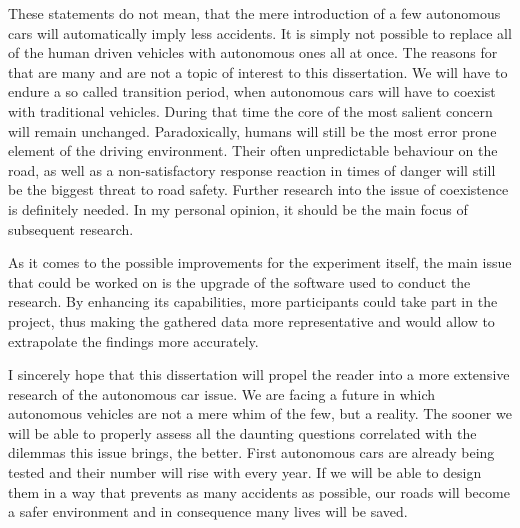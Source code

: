 \documentclass[11pt,english,twoside]{article}
\begin{document}
These statements do not mean, that the mere introduction of a few autonomous cars will automatically imply less accidents. It is simply not possible to replace all of the human driven vehicles with autonomous ones all at once. The reasons for that are many and are not a topic of interest to this dissertation. We will have to endure a so called transition period, when autonomous cars will have to coexist with traditional vehicles. During that time the core of the most salient concern will remain unchanged. Paradoxically, humans will still be the most error prone element of the driving environment. Their often unpredictable behaviour on the road, as well as a non-satisfactory response reaction in times of danger will still be the biggest threat to road safety. Further research into the issue of coexistence is definitely needed. In my personal opinion, it should be the main focus of subsequent research. 



As it comes to the possible improvements for the experiment itself, the main issue that could be worked on is the upgrade of the software used to conduct the research. By enhancing its capabilities, more participants could take part in the project, thus making the gathered data more representative and would allow to extrapolate the findings more accurately.


 
I sincerely hope that this dissertation will propel the reader into a more extensive research of the autonomous car issue. We are facing a future in which autonomous vehicles are not a mere whim of the few, but a reality. The sooner we will be able to properly assess all the daunting questions correlated with the dilemmas this issue brings, the better. First autonomous cars are already being tested and their number will rise with every year. If we will be able to design them in a way that prevents as many accidents as possible, our roads will  become a safer environment and in consequence many lives will be saved.











\end{document}
